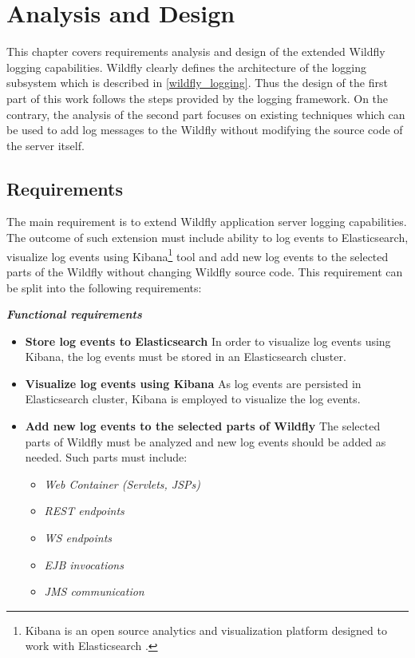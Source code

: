 \documentclass[12pt,oneside]{fithesis2}
\begin{document}
\chapter{Analysis and Design}
This chapter covers requirements analysis and design of the extended Wildfly logging capabilities. Wildfly clearly defines the architecture of the logging subsystem which is described in \ref{wildfly_logging}. Thus the design of the first part of this work follows the steps provided by the logging framework. On the contrary, the analysis of the second part focuses on existing techniques which can be used to add log messages to the Wildfly without modifying the source code of the server itself.

\section{Requirements}
The main requirement is to extend Wildfly application server logging capabilities. The outcome of such extension must include ability to log events to Elasticsearch, visualize log events using Kibana\footnote{Kibana is an open source analytics and visualization platform designed to work with Elasticsearch \cite{kibana_doc}.} tool and add new log events to the selected parts of the Wildfly without changing Wildfly source code. This requirement can be split into the following requirements:

\noindent
\newline
\textit{\textbf{Functional requirements}}
\begin{itemize}
	\item \textbf{Store log events to Elasticsearch} \newline
	In order to visualize log events using Kibana, the log events must be stored in an Elasticsearch cluster.
	\item \textbf{Visualize log events using Kibana} \newline
	As log events are persisted in Elasticsearch cluster, Kibana is employed to visualize the log events.
	\item \textbf{Add new log events to the selected parts of Wildfly}  \newline
	The selected parts of Wildfly must be analyzed and new log events should be added as needed. Such parts must include:
	 \begin{itemize}
	 	\item \textit{Web Container (Servlets, JSPs)}
	 	\item \textit{REST endpoints}
	 	\item \textit{WS endpoints}
	 	\item \textit{EJB invocations}
	 	\item \textit{JMS communication}
	 \end{itemize}
\end{itemize}
\end{document}
